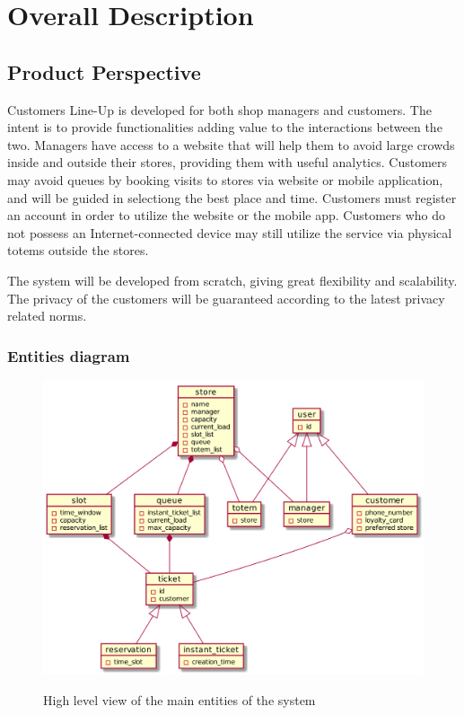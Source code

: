 
\section{Overall Description}\label{sec:overall_desc}

\subsection{Product Perspective}

Customers Line-Up is developed for both shop managers and customers.
The intent is to provide functionalities adding value to the interactions between the two.
Managers have access to a website that will help them to avoid large crowds inside and outside their stores, providing them with useful analytics.
Customers may avoid queues by booking visits to stores via website or mobile application, and will be guided in selectiong the best place and time.
Customers must register an account in order to utilize the website or the mobile app.
Customers who do not possess an Internet-connected device may still utilize the service via physical totems outside the stores.

The system will be developed from scratch, giving great flexibility and scalability.
The privacy of the customers will be guaranteed according to the latest privacy related norms.

\subsubsection{Entities diagram}
\begin{figure}[H]
    \centering
    \includegraphics[width=1\textwidth]{uml/high_level_UML.png}
    \label{fig:high_UML}
    \caption{High level view of the main entities of the system}
\end{figure}


